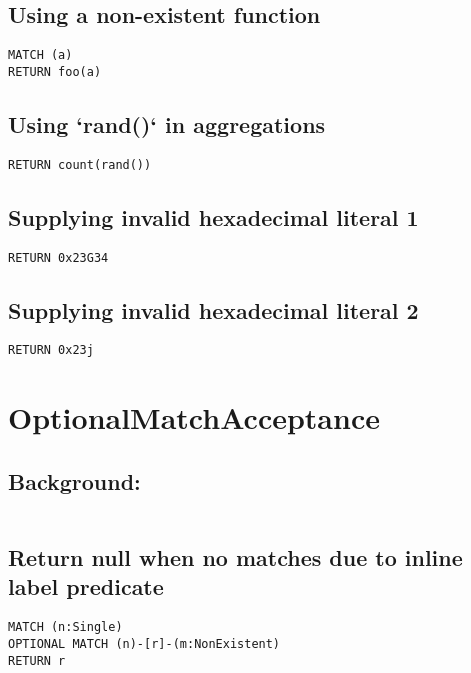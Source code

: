 \subsection{Using a non-existent function}

\begin{lstlisting}
MATCH (a)
RETURN foo(a)
\end{lstlisting}

\subsection{Using `rand()` in aggregations}

\begin{lstlisting}
RETURN count(rand())
\end{lstlisting}

\subsection{Supplying invalid hexadecimal literal 1}

\begin{lstlisting}
RETURN 0x23G34
\end{lstlisting}

\subsection{Supplying invalid hexadecimal literal 2}

\begin{lstlisting}
RETURN 0x23j
\end{lstlisting}
\section{OptionalMatchAcceptance}


\subsection{Background:}

\begin{lstlisting}
\end{lstlisting}

\subsection{Return null when no matches due to inline label predicate}

\begin{lstlisting}
MATCH (n:Single)
OPTIONAL MATCH (n)-[r]-(m:NonExistent)
RETURN r
\end{lstlisting}

